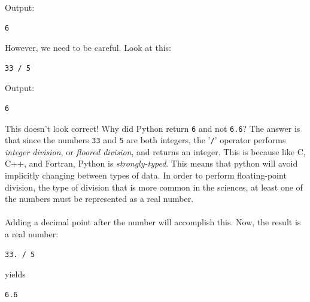 \documentclass[article,A4,12pt]{llncs}
\begin{document}
\noindent
Output:\\

\begin{ybox}
\begin{verbatim}
6
\end{verbatim}
\end{ybox}
\vspace{6mm}

\noindent
However, we need to be careful. Look at this:\\

\begin{bbox}
\begin{verbatim}
33 / 5
\end{verbatim}
\end{bbox}
\vspace{6mm}

\noindent
Output:\\

\begin{ybox}
\begin{verbatim}
6
\end{verbatim}
\end{ybox}
\vspace{6mm}

\noindent
This doesn't look correct! Why did Python return {\tt 6} and not {\tt 6.6}? The answer is that since the numbers {\tt 33} and {\tt 5}
are both integers, the '{\tt /}' operator performs {\em integer division}, or {\em floored division}, and returns an integer. This is because like C, C++, and Fortran, Python is {\em strongly-typed}. This means that python will avoid implicitly changing between types of data. In order to perform floating-point division, the type of division that is more common in the sciences, at least one of the numbers must be represented as a real number.\\
\\
Adding a decimal point after the number will accomplish this. Now, the result is a real number:\\

\begin{bbox}
\begin{verbatim}
33. / 5
\end{verbatim}
\end{bbox}
\vspace{6mm}

\noindent
yields\\

\begin{ybox}
\begin{verbatim}
6.6
\end{verbatim}
\end{ybox}
\vspace{6mm}
\end{document}
